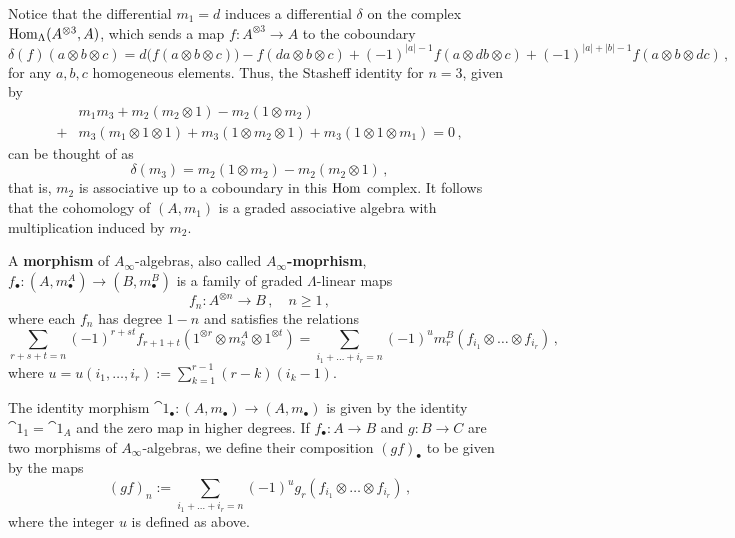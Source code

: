 	Notice that the differential $m_{1}=d$ induces a differential $\delta$
	on the complex $\operatorname{Hom}_{\Lambda}(A^{\otimes 3}, A)$,
	which sends a map $f:A^{\otimes 3} \to A$ to the coboundary
	\begin{equation*}
		\delta(f)(a \otimes b \otimes c)
		= d\big(f(a \otimes b \otimes c)\big)
		- f(da \otimes b \otimes c)
		+ (-1)^{|a|-1} f(a \otimes db \otimes c)
		+ (-1)^{|a|+|b|-1} f(a \otimes b \otimes dc)\,,
	\end{equation*}
	for any $a,b,c$ homogeneous elements.
	 Thus, the Stasheff identity for $n=3$, given by
	 \begin{align*}
	 	&m_{1}m_{3} + m_{2}\left(m_{2} \otimes 1\right) - m_{2}\left( 1 \otimes m_{2} \right) \\
	 	+ &m_{3}\left(m_{1} \otimes 1 \otimes 1 \right) + m_{3}\left(1 \otimes m_{2} \otimes 1\right) 
	 	+ m_{3}\left(1 \otimes 1 \otimes m_{1} \right) = 0\,,
	 \end{align*}
	 can be thought of as
	 \begin{equation*}
	 	\delta(m_{3}) = m_{2}\left(1 \otimes m_{2} \right) - m_{2}\left(m_{2} \otimes 1\right)\,,
	 \end{equation*}
	 that is, $m_{2}$ is associative up to a coboundary in this $\operatorname{Hom}$ complex. 
	 It follows that the cohomology of $(A,m_{1})$ is a graded associative 
	 algebra with multiplication induced by $m_{2}$.
	
	\begin{df}
		A \textbf{morphism} of $A_{\infty}$-algebras, 
		also called \textbf{$A_{\infty}$-moprhism},
		$f_{\bullet}:(A,m_{\bullet}^{A}) \to (B,m_{\bullet}^{B})$
		is a family of graded $\Lambda$-linear maps
		\begin{equation*}
			f_{n} : A^{\otimes n} \longrightarrow B\,, \quad n \ge 1\,,
		\end{equation*}
		where each $f_{n}$ has degree $1-n$ and satisfies the relations
		\begin{equation}\label{stasheff-morph}
			\sum_{r+s+t=n} (-1)^{r+st} f_{r+1+t}(1^{\otimes r} \otimes m_{s}^{A} \otimes 1^{\otimes t}) =
			\sum_{i_{1}+ \dots + i_{r}=n} (-1)^{u} m_{r}^{B}(f_{i_{1}} \otimes \dots \otimes f_{i_{r}})\,,
		\end{equation}
		where $u = u(i_{1}, \dots, i_{r}) := \sum_{k=1}^{r-1}(r-k)(i_{k}-1)$.
	\end{df}
	
	The identity morphism $\cat{1}_{\bullet}: (A,m_{\bullet}) \to (A,m_{\bullet})$
	is given by the identity $\cat{1}_{1} = \cat{1}_{A}$ and the zero map in higher degrees.
	If $f_{\bullet}:A \to B$ and $g:B \to C$ are two morphisms of $A_{\infty}$-algebras,
	we define their composition $(gf)_{\bullet}$ to be given by the maps
	\begin{equation*}
		(gf)_{n} := \sum_{i_{1}+ \dots + i_{r}=n} (-1)^{u} g_{r} \left(f_{i_{1}} \otimes \dots \otimes f_{i_{r}}\right)\,,
	\end{equation*}
	where the integer $u$ is defined as above.
	
